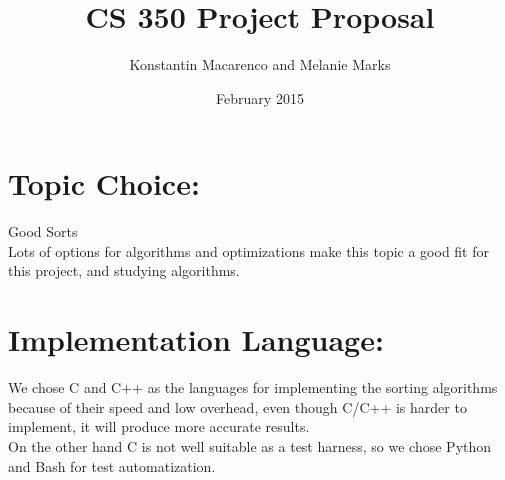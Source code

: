 \documentclass{article}
\title{CS 350 Project Proposal}
\author{Konstantin Macarenco and Melanie Marks }
\date{February 2015}
\begin{document}
\maketitle


%


\noindent
\section*{Topic Choice:}

Good Sorts\\
Lots of options for algorithms and optimizations make this topic a good fit for this project, and studying algorithms.
\section*{Implementation Language:}

We chose C and C++ as the languages for implementing the sorting algorithms because of their speed and low overhead, even though C/C++ is harder to implement, it will produce more accurate results. \\
On the other hand C is not well suitable as a test harness, so we chose Python and Bash for test automatization.\\

\end{document}
